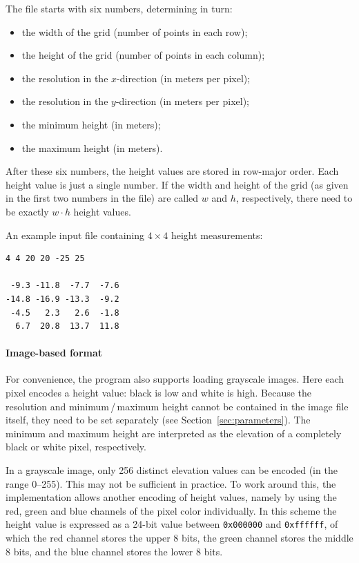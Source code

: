\documentclass{article}
\begin{document}
The file starts with six numbers, determining in turn:
\begin{itemize}
\item the width of the grid (number of points in each row);
\item the height of the grid (number of points in each column);
\item the resolution in the $x$-direction (in meters per pixel);
\item the resolution in the $y$-direction (in meters per pixel);
\item the minimum height (in meters);
\item the maximum height (in meters).
\end{itemize}
After these six numbers, the height values are stored in row-major order. Each height value is just a single number. If the width and height of the grid (as given in the first two numbers in the file) are called $w$ and $h$, respectively, there need to be exactly $w \cdot h$ height values.

An example input file containing $4 \times 4$ height measurements:
\begin{verbatim}
4 4 20 20 -25 25

 -9.3 -11.8  -7.7  -7.6
-14.8 -16.9 -13.3  -9.2
 -4.5   2.3   2.6  -1.8
  6.7  20.8  13.7  11.8
\end{verbatim}

\paragraph{Image-based format}
For convenience, the program also supports loading grayscale images. Here each pixel encodes a height value: black is low and white is high. Because the resolution and minimum\,/\,maximum height cannot be contained in the image file itself, they need to be set separately (see Section~\ref{sec:parameters}). The minimum and maximum height are interpreted as the elevation of a completely black or white pixel, respectively.

In a grayscale image, only 256 distinct elevation values can be encoded (in the range 0--255). This may not be sufficient in practice. To work around this, the implementation allows another encoding of height values, namely by using the red, green and blue channels of the pixel color individually. In this scheme the height value is expressed as a 24-bit value between \texttt{0x000000} and \texttt{0xffffff}, of which the red channel stores the upper 8 bits, the green channel stores the middle 8 bits, and the blue channel stores the lower 8 bits.
\end{document}
